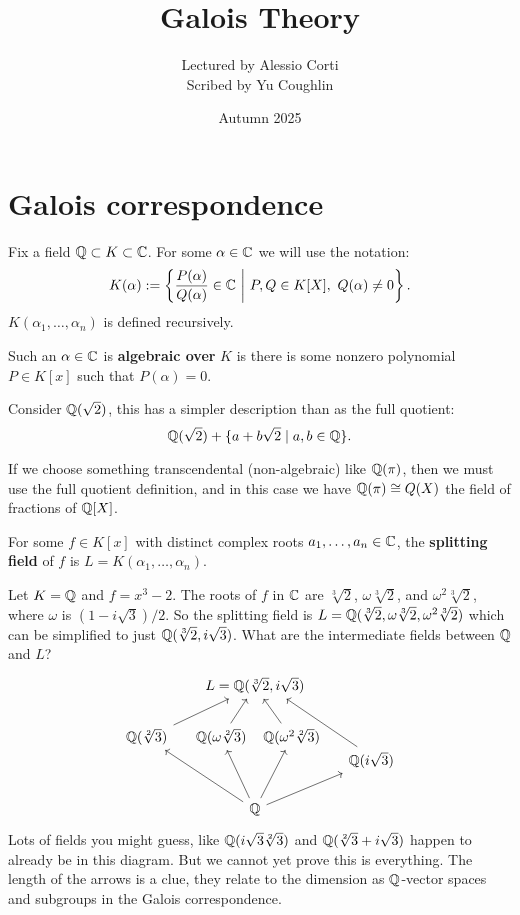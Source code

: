 \documentclass{article}
\begin{document}
\title{Galois Theory}
\author{Lectured by Alessio Corti \\
Scribed by Yu Coughlin}
\date{Autumn 2025}

\maketitle

\tableofcontents

\section{Galois correspondence}

Fix a field $\mathbb{Q}\subset K \subset \mathbb{C}$. For some $\alpha\in \mathbb{C}$ we will use the notation: \[
K(\alpha) := \left\{
    \frac{P(\alpha)}{Q(\alpha)} \in \bC \ \middle| \ P,Q\in K[X], \ Q(\alpha)\neq 0
\right\}.
\]
$K(\alpha_1,\ldots,\alpha_n)$ is defined recursively.

\begin{definition}
    Such an $\alpha\in \mathbb{C}$ is \textbf{algebraic over} $K$ is there is some nonzero polynomial $P\in K[x]$ such that $P(\alpha) = 0$.
\end{definition}

Consider $\mathbb{Q}(\sqrt{2})$, this has a simpler description than as the full quotient: \[
\mathbb{Q}(\sqrt{2}) + \{a + b\sqrt{2} \mid a,b\in\mathbb{Q}\}.
\]

If we choose something transcendental (non-algebraic) like $\mathbb{Q}(\pi)$, then we must use the full quotient definition, and in this case we have $\mathbb{Q}(\pi)\cong Q(X)$ the field of fractions of $\mathbb{Q}[X]$.

\begin{definition}
    For some $f\in K[x]$ with distinct complex roots $a_1,\ldots,a_n\in\mathbb{C}$, the \textbf{splitting field} of $f$ is $L=K(\alpha_1,\ldots,\alpha_n)$.
\end{definition}

Let $K=\mathbb{Q}$ and $f=x^3-2$. The roots of $f$ in $\mathbb{C}$ are $\sqrt[3]{2}$, $\omega \sqrt[3]{2}$, and $\omega^2\sqrt[3]{2}$, where $\omega$ is $(1-i\sqrt{3})/2$. So the splitting field is $L=\mathbb{Q}(\sqrt[3]{2},\omega\sqrt[3]{2},\omega^2\sqrt[3]{2})$ which can be simplified to just $\mathbb{Q}(\sqrt[3]{2},i\sqrt{3})$. What are the intermediate fields between $\mathbb{Q}$ and $L$? 
\vspace{-10pt}
\[
\begin{tikzcd}[column sep=small]
& &[-50pt] L = \bQ(\sqrt[3]{2},i\sqrt{3})\\
\bQ(\sqrt[2]{3}) \arrow[urr] 
& \bQ(\omega\sqrt[2]{3}) \arrow[ur] 
& &[-50pt] \bQ(\omega^2\sqrt[2]{3}) \arrow[ul]\\[-20pt]
& & & & \bQ(i\sqrt{3})\arrow[uull, end anchor={[xshift=-4ex]south east}]\\
& & \bQ \arrow[uull] \arrow[uul] \arrow[uur] \arrow[urr]
\end{tikzcd}
\] Lots of fields you might guess, like $\mathbb{Q}(i\sqrt{3}\sqrt[2]{3})$ and $\mathbb{Q}(\sqrt[2]{3} + i\sqrt{3})$ happen to already be in this diagram. But we cannot yet prove this is everything. The length of the arrows is a clue, they relate to the dimension as $\mathbb{Q}$-vector spaces and subgroups in the Galois correspondence.
\end{document}
